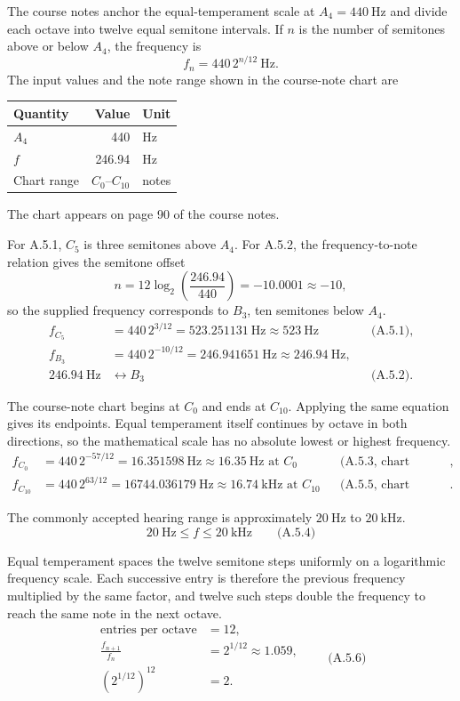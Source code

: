 The course notes anchor the equal-temperament scale at $A_4=440\ \mathrm{Hz}$ and divide each octave into twelve equal semitone intervals. If $n$ is the number of semitones above or below $A_4$, the frequency is
\[
f_n=440\,2^{n/12}\ \mathrm{Hz}.
\]
The input values and the note range shown in the course-note chart are
\begin{center}\small
\begin{tabular}{@{}lrl@{}}
\toprule\noalign{}
Quantity & Value & Unit \\
\midrule\noalign{}
$A_4$ & 440 & Hz \\
$f$ & 246.94 & Hz \\
Chart range & $C_0$--$C_{10}$ & notes \\
\bottomrule
\end{tabular}
\end{center}
The chart appears on page 90 of the course notes.

For A.5.1, $C_5$ is three semitones above $A_4$. For A.5.2, the frequency-to-note relation gives the semitone offset
\[
n=12\log_2\!\left(\frac{246.94}{440}\right)=-10.0001\approx-10,
\]
so the supplied frequency corresponds to $B_3$, ten semitones below $A_4$.
\[
\begin{aligned}
f_{C_5}&=440\,2^{3/12}=523.251131\ \mathrm{Hz}\approx\boxed{523\ \mathrm{Hz}} &&\text{(A.5.1)},\\
f_{B_3}&=440\,2^{-10/12}=246.941651\ \mathrm{Hz}\approx246.94\ \mathrm{Hz},\\
246.94\ \mathrm{Hz}&\longleftrightarrow\boxed{B_3} &&\text{(A.5.2)}.
\end{aligned}
\]

The course-note chart begins at $C_0$ and ends at $C_{10}$. Applying the same equation gives its endpoints. Equal temperament itself continues by octave in both directions, so the mathematical scale has no absolute lowest or highest frequency.
\[
\begin{aligned}
f_{C_0}&=440\,2^{-57/12}=16.351598\ \mathrm{Hz}\approx\boxed{16.35\ \mathrm{Hz}\text{ at }C_0} &&\text{(A.5.3, chart minimum)},\\
f_{C_{10}}&=440\,2^{63/12}=16744.036179\ \mathrm{Hz}\approx\boxed{16.74\ \mathrm{kHz}\text{ at }C_{10}} &&\text{(A.5.5, chart maximum)}.
\end{aligned}
\]

The commonly accepted hearing range is approximately $20\ \mathrm{Hz}$ to $20\ \mathrm{kHz}$.
\[
\boxed{20\ \mathrm{Hz}\leq f\leq20\ \mathrm{kHz}}\qquad\text{(A.5.4)}
\]

Equal temperament spaces the twelve semitone steps uniformly on a logarithmic frequency scale. Each successive entry is therefore the previous frequency multiplied by the same factor, and twelve such steps double the frequency to reach the same note in the next octave.
\[
\boxed{\begin{aligned}
\text{entries per octave}&=12,\\
\frac{f_{n+1}}{f_n}&=2^{1/12}\approx1.059,\\
\left(2^{1/12}\right)^{12}&=2.
\end{aligned}}\qquad\text{(A.5.6)}
\]

\clearpage
{}

